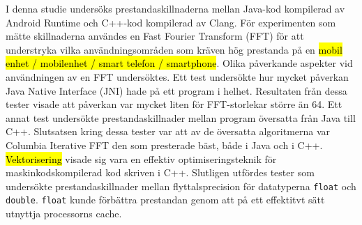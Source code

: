 I denna studie undersöks prestandaskillnaderna mellan Java-kod kompilerad av Android Runtime och C++-kod kompilerad av Clang. För experimenten som mätte skillnaderna användes en Fast Fourier Transform (FFT) för att understryka vilka användningsområden som kräven hög prestanda på en \hl{mobil enhet / mobilenhet / smart telefon / smartphone}. Olika påverkande aspekter vid användningen av en FFT undersöktes. Ett test undersökte hur mycket påverkan Java Native Interface (JNI) hade på ett program i helhet. Resultaten från dessa tester visade att påverkan var mycket liten för FFT-storlekar större än 64. Ett annat test undersökte prestandaskillnader mellan program översatta från Java till C++. Slutsatsen kring dessa tester var att av de översatta algoritmerna var Columbia Iterative FFT den som presterade bäst, både i Java och i C++. \hl{Vektorisering} visade sig vara en effektiv optimiseringsteknik för maskinkodskompilerad kod skriven i C++. Slutligen utfördes tester som undersökte prestandaskillnader mellan flyttalsprecision för datatyperna \texttt{float} och \texttt{double}. \texttt{float} kunde förbättra prestandan genom att på ett effektitvt sätt utnyttja processorns cache.
